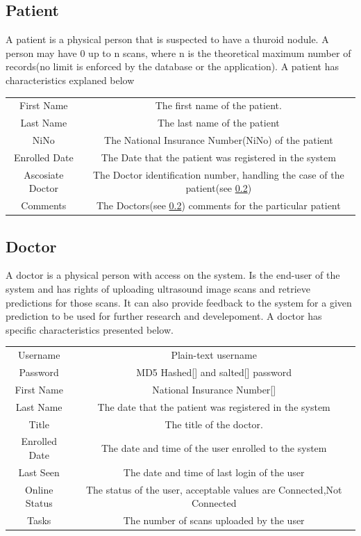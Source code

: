 	\subsection{Patient}
	\label{patient-definition}
	A patient is a physical person that is suspected to have a thuroid nodule. A person may have 0 up to n scans, where n is the theoretical
	maximum number of records(no limit is enforced by the database or the application). A patient has characteristics explaned below
	\begin{center}
		\begin{tabular}{ |c|c| } 
			\hline
			First Name & The first name of the patient.\\
			Last Name & The last name of the patient \\
			NiNo & The National Insurance Number(NiNo) of the patient \\
			Enrolled Date & The Date that the patient was registered in the system \\
			Ascosiate Doctor& The Doctor identification number, handling the case of the patient(see \ref{doctor-definition}) \\
			Comments& The Doctors(see \ref{doctor-definition}) comments for the particular patient\\
			\hline
		\end{tabular}
	\end{center}
	\subsection{Doctor}
	\label{doctor-definition}
	A doctor is a physical person with access on the system. Is the end-user of the system and has rights of uploading ultrasound image
	scans and retrieve predictions for those scans. It can also provide feedback to the system for a given prediction to be used for 
	further research and develepoment. A doctor has specific characteristics presented below.
	\begin{center}
		\begin{tabular}{ |c|c| } 
			\hline
			Username & Plain-text username\\
			Password & MD5 Hashed[\cite{rfc1321}] and salted[\cite{MANBER1996171}] password \\
			First Name & National Insurance Number[\cite{nino-format}] \\
			Last Name & The date that the patient was registered in the system \\
			Title& The title of the doctor.\\
			Enrolled Date& The date and time of the user enrolled to the system\\
			Last Seen& The date and time of last login of the user \\
			Online Status& The status of the user, acceptable values are Connected,Not Connected \\
			Tasks& The number of scans uploaded by the user \\
			\hline
		\end{tabular}
	\end{center}
